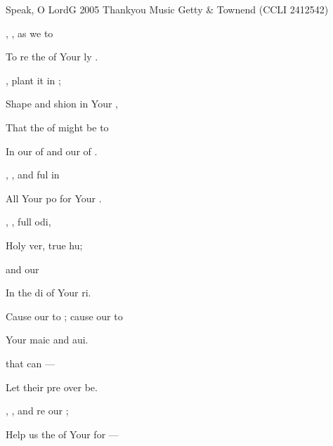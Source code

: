 \documentclass[12pt]{book}
\newcommand{\CCLInumber}{2412542}
\newcommand{\CCLIed}{{\CpyRtInfoFont (CCLI \CCLInumber)}}
\begin{document}
\mainmatter
\ifWordBk
  \twocolumn
\fi

\begin{song}{Speak, O Lord}{G}
    {2005 Thankyou Music}
    {Getty \& Townend}
    {}
    {\CCLIed}

\begin{SBVerse}
,  , 
    as we  to 

To re the  
    of Your ly .

  , 
    plant it  in ;

Shape and shion  
    in Your ,

That the  of  
    might be  to

In our  of  
    and our  of .

,  , 
    and ful in  

All Your po for Your .
\end{SBVerse}

\begin{SBVerse}
 , , 
    full odi,

Holy ver, 
    true hu;
    
   
    and our 

In the di 
    of Your ri.

Cause our  to ; 
    cause our  to 

Your maic  
    and aui.

   
    that can  —

Let their  pre 
    over be.
\end{SBVerse}

\begin{SBVerse}
,  , 
    and re our ;

Help us  the  
    of Your  for —


\end{SBVerse}
\end{song}
\end{document}
